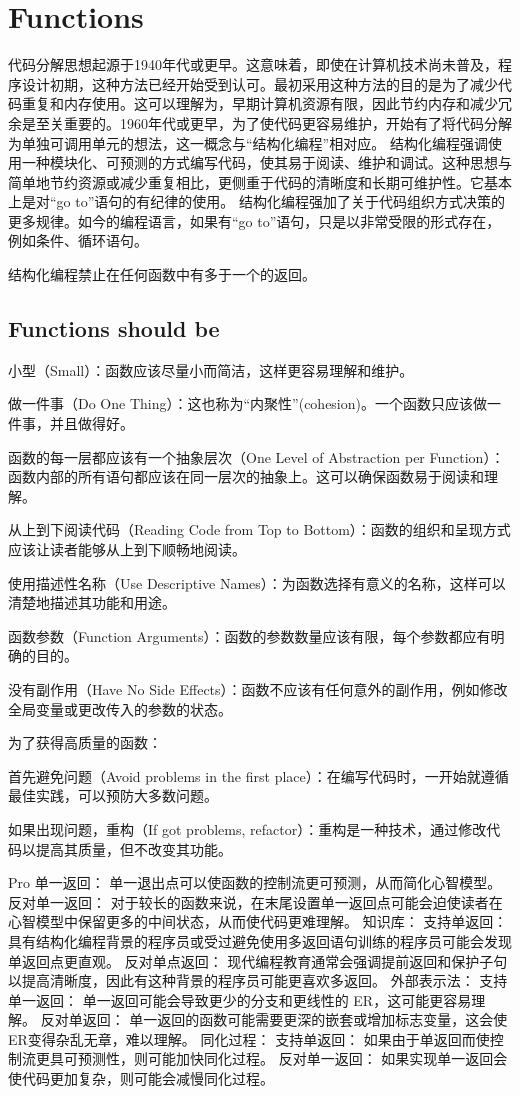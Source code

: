 \chapter{Functions}

代码分解思想起源于1940年代或更早。这意味着，即使在计算机技术尚未普及，程序设计初期，这种方法已经开始受到认可。最初采用这种方法的目的是为了减少代码重复和内存使用。这可以理解为，早期计算机资源有限，因此节约内存和减少冗余是至关重要的。1960年代或更早，为了使代码更容易维护，开始有了将代码分解为单独可调用单元的想法，这一概念与“结构化编程”相对应。
结构化编程强调使用一种模块化、可预测的方式编写代码，使其易于阅读、维护和调试。这种思想与简单地节约资源或减少重复相比，更侧重于代码的清晰度和长期可维护性。它基本上是对“go to”语句的有纪律的使用。
结构化编程强加了关于代码组织方式决策的更多规律。如今的编程语言，如果有“go to”语句，只是以非常受限的形式存在，例如条件、循环语句。

结构化编程禁止在任何函数中有多于一个的返回。

\section{Functions should be}
小型（Small）：函数应该尽量小而简洁，这样更容易理解和维护。

做一件事（Do One Thing）：这也称为“内聚性”(cohesion)。一个函数只应该做一件事，并且做得好。

函数的每一层都应该有一个抽象层次（One Level of Abstraction per Function）：函数内部的所有语句都应该在同一层次的抽象上。这可以确保函数易于阅读和理解。

从上到下阅读代码（Reading Code from Top to Bottom）：函数的组织和呈现方式应该让读者能够从上到下顺畅地阅读。

使用描述性名称（Use Descriptive Names）：为函数选择有意义的名称，这样可以清楚地描述其功能和用途。

函数参数（Function Arguments）：函数的参数数量应该有限，每个参数都应有明确的目的。

没有副作用（Have No Side Effects）：函数不应该有任何意外的副作用，例如修改全局变量或更改传入的参数的状态。

为了获得高质量的函数：

首先避免问题（Avoid problems in the first place）：在编写代码时，一开始就遵循最佳实践，可以预防大多数问题。

如果出现问题，重构（If got problems, refactor）：重构是一种技术，通过修改代码以提高其质量，但不改变其功能。

Pro 单一返回： 单一退出点可以使函数的控制流更可预测，从而简化心智模型。
反对单一返回： 对于较长的函数来说，在末尾设置单一返回点可能会迫使读者在心智模型中保留更多的中间状态，从而使代码更难理解。
知识库：
支持单返回： 具有结构化编程背景的程序员或受过避免使用多返回语句训练的程序员可能会发现单返回点更直观。
反对单点返回： 现代编程教育通常会强调提前返回和保护子句以提高清晰度，因此有这种背景的程序员可能更喜欢多返回。
外部表示法：
支持单一返回： 单一返回可能会导致更少的分支和更线性的 ER，这可能更容易理解。
反对单返回： 单一返回的函数可能需要更深的嵌套或增加标志变量，这会使ER变得杂乱无章，难以理解。
同化过程：
支持单返回： 如果由于单返回而使控制流更具可预测性，则可能加快同化过程。
反对单一返回： 如果实现单一返回会使代码更加复杂，则可能会减慢同化过程。

